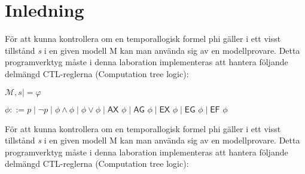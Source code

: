 \section{Inledning}
För att kunna kontrollera om en temporallogisk formel phi gäller i ett visst tillstånd \textit{s} i en given modell M kan man använda sig
av en modellprovare. Detta programverktyg måste i denna laboration implementeras att hantera följande delmängd CTL-reglerna (Computation tree
logic):

\begin{center}

$\mathcal{M} , s \mid = \varphi$

$\phi ::= p \mid \neg p \mid \phi \wedge \phi \mid \phi \vee \phi \mid \textsf{AX } \phi \mid \textsf{AG } \phi \mid \textsf{EX } \phi \mid \textsf{EG } \phi \mid \textsf{EF } \phi $

\end{center}

För att kunna kontrollera om en temporallogisk formel phi gäller i ett visst tillstånd \textit{s} i en given modell M kan man använda sig 
av en modellprovare. Detta programverktyg måste i denna laboration implementeras att hantera följande delmängd CTL-reglerna (Computation tree 
logic):